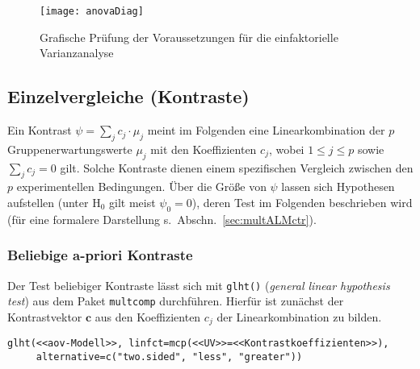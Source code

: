 \begin{figure}[ht]
\centering
\texttt{[image: anovaDiag]}
\vspace*{-0.5em}
\caption{Grafische Prüfung der Voraussetzungen für die einfaktorielle Varianzanalyse}
\label{fig:anovaDiag}
\end{figure}

\subsection{Einzelvergleiche (Kontraste)}

Ein Kontrast $\psi = \sum_{j} c_{j} \cdot \mu_{j}$ meint im Folgenden eine Linearkombination der $p$ Gruppenerwartungswerte $\mu_{j}$ mit den Koeffizienten $c_{j}$, wobei $1 \leq j \leq p$ sowie $\sum_{j} c_{j} = 0$ gilt. Solche Kontraste dienen einem spezifischen Vergleich zwischen den $p$ experimentellen Bedingungen. Über die Größe von $\psi$ lassen sich Hypothesen aufstellen (unter $\text{H}_{0}$ gilt meist $\psi_{0} = 0$), deren Test im Folgenden beschrieben wird (für eine formalere Darstellung s.\ Abschn.\ \ref{sec:multALMctr}).

\subsubsection{Beliebige a-priori Kontraste}
\label{sec:contrCRp}

Der Test beliebiger Kontraste lässt sich mit \lstinline!glht()! (\emph{general linear hypothesis test}) aus dem Paket \lstinline!multcomp! \cite{Hothorn2008} durchführen. Hierfür ist zunächst der Kontrastvektor $\bm{c}$ aus den Koeffizienten $c_{j}$ der Linearkombination zu bilden.
\begin{lstlisting}
glht(<<aov-Modell>>, linfct=mcp(<<UV>>=<<Kontrastkoeffizienten>>),
     alternative=c("two.sided", "less", "greater"))
\end{lstlisting}

